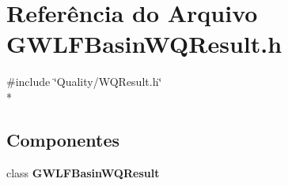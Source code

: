 \section{Referência do Arquivo G\+W\+L\+F\+Basin\+W\+Q\+Result.\+h}
\label{_g_w_l_f_basin_w_q_result_8h}
{\ttfamily \#include \char`\"{}Quality/\+W\+Q\+Result.\+h\char`\"{}}\\*
\subsection*{Componentes}
\begin{DoxyCompactItemize}
\item 
class {\bf G\+W\+L\+F\+Basin\+W\+Q\+Result}
\end{DoxyCompactItemize}
